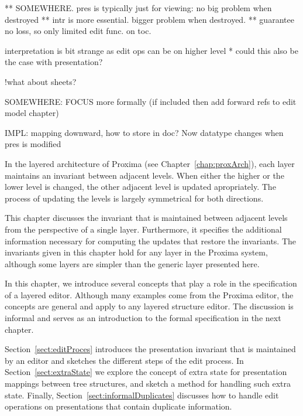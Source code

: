 ** SOMEWHERE. pres is typically just for viewing: no big problem when destroyed
** intr is more essential. bigger problem when destroyed.
** guarantee no loss, so only limited edit func. on toc.

interpretation is bit strange as edit ops can be on higher level
* could this also be the case with presentation?


!what about sheets? 

SOMEWHERE: FOCUS more formally (if included then add forward refs to edit model chapter)


IMPL: mapping downward, how to store in doc? Now datatype changes when pres is modified

\ec






\bc
In the layered architecture of Proxima (see Chapter~\ref{chap:proxArch}), each layer maintains an invariant between adjacent levels. When either the higher or the lower level is changed, the other adjacent level is updated apropriately. The process of updating the levels is largely symmetrical for both directions.

This chapter discusses the invariant that is maintained between adjacent levels from the perspective of a single layer. Furthermore, it specifies the additional information necessary for computing the updates that restore the invariants. The invariants given in this chapter hold for any layer in the Proxima system, although some layers are simpler than the generic layer presented here.

\ec

In this chapter, we introduce several concepts that play a role in the specification of a layered editor. Although many examples come from the Proxima editor, the concepts are general and apply to any layered structure editor. The discussion is informal and serves as an introduction to the formal specification in the next chapter.

Section~\ref{sect:editProces} introduces the presentation invariant that is maintained by an editor and sketches the different steps of the edit process. In Section~\ref{sect:extraState} we explore the concept of extra state for presentation mappings between tree structures, and sketch a method for handling such extra state. Finally, Section~\ref{sect:informalDuplicates} discusses how to handle edit operations on presentations that contain duplicate information.


